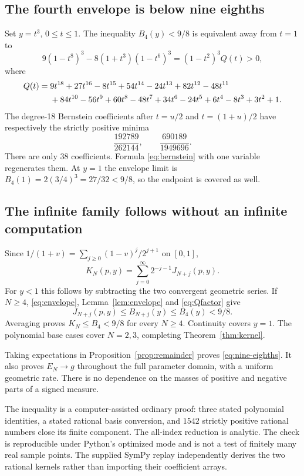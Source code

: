 \subsection{The fourth envelope is below nine eighths}
Set $y=t^3$, $0\le t\le1$. The inequality $B_4(y)<9/8$ is equivalent away from $t=1$ to
\begin{equation}\label{eq:Qfactor}
9(1-t^8)^3-8(1+t^3)(1-t^6)^3=(1-t^2)^3Q(t)>0,
\end{equation}
where
\begin{align}\label{eq:Q}
Q(t)={}&9t^{18}+27t^{16}-8t^{15}+54t^{14}-24t^{13}+82t^{12}
 -48t^{11}\notag\\
&+84t^{10}-56t^9+60t^8-48t^7+34t^6-24t^5
 +6t^4-8t^3+3t^2+1.
\end{align}
The degree-18 Bernstein coefficients after $t=u/2$ and $t=(1+u)/2$ have respectively the strictly positive minima
\begin{equation}\label{eq:Qmin}
 \frac{192789}{262144},\qquad \frac{690189}{1949696}.
\end{equation}
There are only $38$ coefficients. Formula \eqref{eq:bernstein} with one variable regenerates them. At $y=1$ the envelope limit is
$B_4(1)=2(3/4)^3=27/32<9/8$, so the endpoint is covered as well.

\subsection{The infinite family follows without an infinite computation}
Since $1/(1+v)=\sum_{j\ge0}(1-v)^j/2^{j+1}$ on $[0,1]$,
\begin{equation}\label{eq:mixture}
 K_N(p,y)=\sum_{j=0}^{\infty}2^{-j-1}J_{N+j}(p,y).
\end{equation}
For $y<1$ this follows by subtracting the two convergent geometric series. If $N\ge4$, \eqref{eq:envelope}, Lemma~\ref{lem:envelope} and \eqref{eq:Qfactor} give
\[
 J_{N+j}(p,y)\le B_{N+j}(y)\le B_4(y)<9/8.
\]
Averaging proves $K_N\le B_4<9/8$ for every $N\ge4$. Continuity covers $y=1$. The polynomial base cases cover $N=2,3$, completing Theorem~\ref{thm:kernel}.

Taking expectations in Proposition~\ref{prop:remainder} proves \eqref{eq:nine-eighths}. It also proves $E_N\to g$ throughout the full parameter domain, with a uniform geometric rate. There is no dependence on the masses of positive and negative parts of a signed measure.

\begin{remark}
The inequality is a computer-assisted ordinary proof: three stated polynomial identities, a stated rational basis conversion, and $1542$ strictly positive rational numbers close its finite component. The all-index reduction is analytic. The check is reproducible under Python's optimized mode and is not a test of finitely many real sample points. The supplied SymPy replay independently derives the two rational kernels rather than importing their coefficient arrays.
\end{remark}
